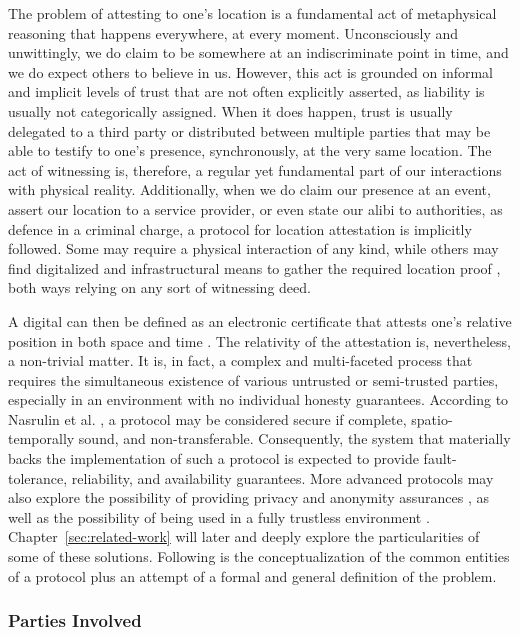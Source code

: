 The problem of attesting to one's location is a fundamental act of metaphysical reasoning that happens everywhere, at every moment. Unconsciously and unwittingly, we do claim to be somewhere at an indiscriminate point in time, and we do expect others to believe in us. However, this act is grounded on informal and implicit levels of trust that are not often explicitly asserted, as liability is usually not categorically assigned. When it does happen, trust is usually delegated to a third party or distributed between multiple parties that may be able to testify to one's presence, synchronously, at the very same location. The act of witnessing is, therefore, a regular yet fundamental part of our interactions with physical reality. Additionally, when we do claim our presence at an event, assert our location to a service provider, or even state our alibi to authorities, as defence in a criminal charge, a protocol for location attestation is implicitly followed. Some may require a physical interaction of any kind, while others may find digitalized and infrastructural means to gather the required location proof \cite{luo2010veriplace}, both ways relying on any sort of witnessing deed.

A digital \pol{} can then be defined as an electronic certificate that attests one's relative position in both space and time \cite{amoretti2018blockchain}. The relativity of the attestation is, nevertheless, a non-trivial matter. It is, in fact, a complex and multi-faceted process that requires the simultaneous existence of various untrusted or semi-trusted parties, especially in an environment with no individual honesty guarantees. According to Nasrulin et al. \cite{nasrulin2018robust}, a \pol{} protocol may be considered secure if complete, spatio-temporally sound, and non-transferable. Consequently, the system that materially backs the implementation of such a protocol is expected to provide fault-tolerance, reliability, and availability guarantees. More advanced protocols may also explore the possibility of providing privacy and anonymity assurances \cite{li2020privacy}, as well as the possibility of being used in a fully trustless environment \cite{amoretti2018blockchain}. Chapter~\ref{sec:related-work} will later and deeply explore the particularities of some of these solutions. Following is the conceptualization of the common entities of a \pol{} protocol plus an attempt of a formal and general definition of the problem.

\subsubsection{Parties Involved}

